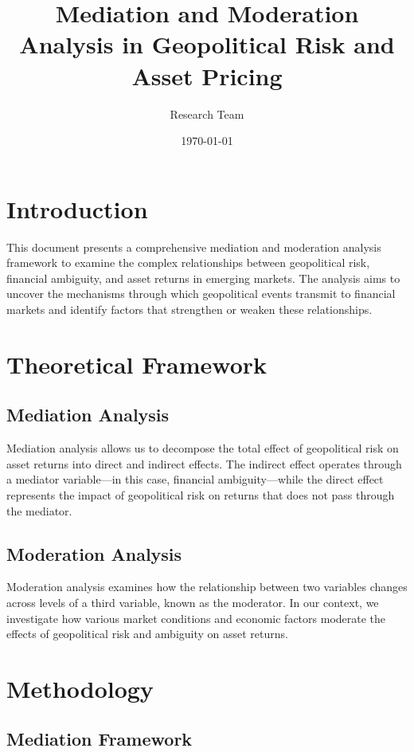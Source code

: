 \documentclass{article}
\title{Mediation and Moderation Analysis in Geopolitical Risk and Asset Pricing}
\author{Research Team}
\date{\today}
\begin{document}
\maketitle

\section{Introduction}

This document presents a comprehensive mediation and moderation analysis framework to examine the complex relationships between geopolitical risk, financial ambiguity, and asset returns in emerging markets. The analysis aims to uncover the mechanisms through which geopolitical events transmit to financial markets and identify factors that strengthen or weaken these relationships.

\section{Theoretical Framework}

\subsection{Mediation Analysis}

Mediation analysis allows us to decompose the total effect of geopolitical risk on asset returns into direct and indirect effects. The indirect effect operates through a mediator variable—in this case, financial ambiguity—while the direct effect represents the impact of geopolitical risk on returns that does not pass through the mediator.

\subsection{Moderation Analysis}

Moderation analysis examines how the relationship between two variables changes across levels of a third variable, known as the moderator. In our context, we investigate how various market conditions and economic factors moderate the effects of geopolitical risk and ambiguity on asset returns.

\section{Methodology}

\subsection{Mediation Framework}
\end{document}
